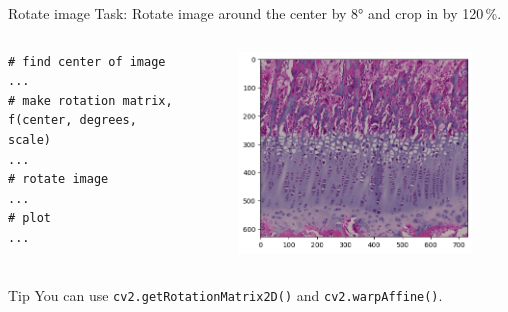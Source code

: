\documentclass[compress%
,aspectratio=169%
]{beamer}
\begin{document}
\begin{frame}[fragile]{Rotate image}
\alert{Task:} Rotate image around the center by 8° and crop in by 120\,\%.
\vspace{-0.2cm}
\begin{columns}
    \begin{lstlisting}
# find center of image
...
# make rotation matrix, f(center, degrees, scale)
...
# rotate image
...
# plot
...
\end{lstlisting}
\begin{figure}
    \includegraphics[width = 1\linewidth,left]{mpimgbeamertheme/img/pig_rotated.png}
\end{figure}
\end{columns}\vspace{-0cm}
\begin{alertblock}{Tip}
You can use \texttt{cv2.getRotationMatrix2D()} and \texttt{cv2.warpAffine()}.
\end{alertblock}
\end{frame}
\end{document}

